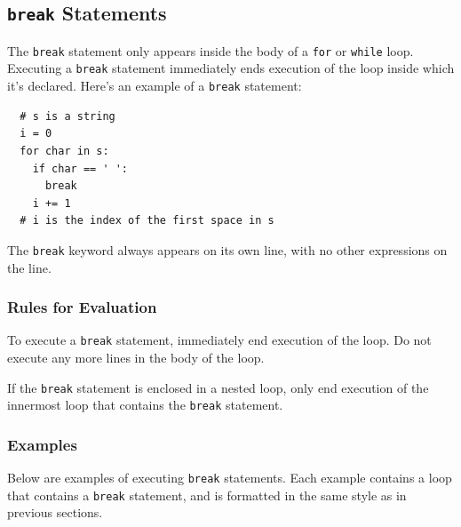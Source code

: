 \documentclass{article}
\newcommand{\expr}[1]{\texttt{#1}}
\newcommand{\kw}[1]{\expr{#1}}
\begin{document}
\subsection{\kw{break} Statements}
\label{sec:break-statement}

  The \kw{break} statement only appears inside the body of a \kw{for} or \kw{while} loop. Executing a \kw{break} statement immediately ends execution of the loop inside which it's declared. Here's an example of a \kw{break} statement:

\begin{verbatim}
  # s is a string
  i = 0
  for char in s:
    if char == ' ':
      break
    i += 1
  # i is the index of the first space in s
\end{verbatim}

  The \kw{break} keyword always appears on its own line, with no other expressions on the line.

\subsubsection{Rules for Evaluation}

  To execute a \kw{break} statement, immediately end execution of the loop. Do not execute any more lines in the body of the loop.

  If the \kw{break} statement is enclosed in a nested loop, only end execution of the innermost loop that contains the \kw{break} statement.

\subsubsection{Examples}

  Below are examples of executing \kw{break} statements. Each example contains a loop that contains a \kw{break} statement, and is formatted in the same style as in previous sections.
\end{document}
